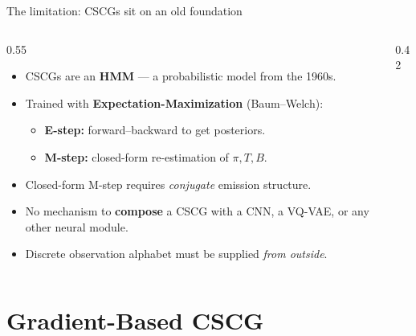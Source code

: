 \documentclass[aspectratio=169,10pt]{beamer}
\begin{document}
\begin{frame}{The limitation: CSCGs sit on an old foundation}
  \begin{columns}[T,onlytextwidth]
    \begin{column}{0.55\textwidth}
      \begin{itemize}\setlength\itemsep{0.45em}
        \item CSCGs are an \textbf{HMM} --- a probabilistic model from the 1960s.
        \item Trained with \textbf{Expectation-Maximization} (Baum--Welch):
        \begin{itemize}
          \item \textbf{E-step:} forward--backward to get posteriors.
          \item \textbf{M-step:} closed-form re-estimation of $\pi, T, B$.
        \end{itemize}
        \item Closed-form M-step requires \emph{conjugate} emission structure.
        \item No mechanism to \textbf{compose} a CSCG with a CNN, a VQ-VAE,
              or any other neural module.
        \item Discrete observation alphabet must be supplied \emph{from
              outside}.
      \end{itemize}
    \end{column}
    \begin{column}{0.42\textwidth}
      \centering
    \end{column}
  \end{columns}
\end{frame}

\section{Gradient-Based CSCG}
\end{document}
